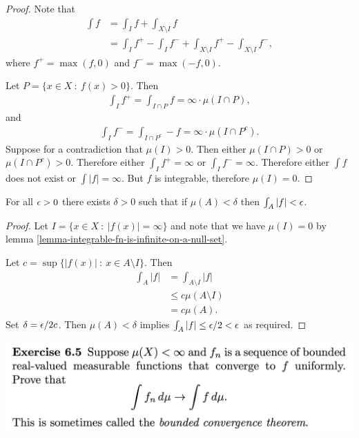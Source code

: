 \begin{proof}
  Note that
  \begin{align*}
    \int f &= \int_I f + \int_{X \setminus I} f \\
           &= \int_I f^+ - \int_I f^- + \int_{X \setminus I} f^+ - \int_{X \setminus I} f^-,
  \end{align*}
  where $f^+ = \max(f, 0)$ and $f^- = \max(-f, 0)$.

  Let $P = \{x \in X ~:~ f(x) > 0 \}$. Then
  \begin{align*}
    \int_I f^+ = \int_{I \cap P} f = \infty \cdot \mu(I \cap P),
  \end{align*}
  and
  \begin{align*}
    \int_I f^- = \int_{I \cap P^c} -f = \infty \cdot \mu(I \cap P^c).
  \end{align*}
  Suppose for a contradiction that $\mu(I) > 0$. Then either $\mu(I \cap P) > 0$ or $\mu(I \cap P^c) > 0$.
  Therefore either $\int_I f^+ = \infty$ or $\int_I f^- = \infty$. Therefore either $\int f$ does not exist
  or $\int |f| = \infty$. But $f$ is integrable, therefore $\mu(I) = 0$.
\end{proof}

\begin{claim*}
  For all $\epsilon > 0$ there exists $\delta > 0$ such that if $\mu(A) < \delta$ then $\int_A |f| < \epsilon$.
\end{claim*}

\begin{proof}
  Let $I = \{x \in X ~:~ |f(x)| = \infty \}$ and note that we have $\mu(I) = 0$ by lemma
  \eqref{lemma-integrable-fn-is-infinite-on-a-null-set}.

  Let $c = \sup \{|f(x)| ~:~ x \in A \setminus I\}$. Then
  \begin{align*}
    \int_A |f| &= \int_{A\setminus I} |f| \\
               &\leq c\mu(A \setminus I) \\
               &= c\mu(A).
  \end{align*}
  Set $\delta = \epsilon/2c$. Then $\mu(A) < \delta$ implies $\int_A |f| \leq \epsilon/2 < \epsilon$ as required.
\end{proof}

\newpage
\begin{mdframed}
\includegraphics[width=400pt]{img/analysis--berkeley-202a-hw07-9983.png}
\end{mdframed}